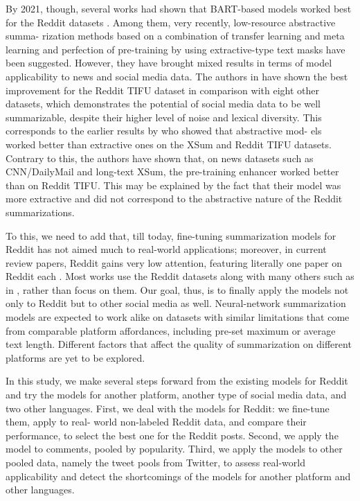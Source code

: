 By 2021, though, several works had shown that BART-based models worked best for the Reddit datasets \cite{ChenLiuZhong}. Among them, very recently, low-resource abstractive summa- rization methods based on a combination of transfer learning and meta learning \cite{ChenShuai} and perfection of pre-training by using extractive-type text masks \cite{ZhangZhaoSaleh} have been suggested. However, they have brought mixed results in terms of model applicability to news and social media data. The authors in \cite{ChenShuai} have shown the best improvement for the Reddit TIFU dataset in comparison with eight other datasets, which demonstrates the potential of social media data to be well summarizable, despite their higher level of noise and lexical diversity. This corresponds to the earlier results by \cite{ChenLiuZhong} who showed that abstractive mod- els worked better than extractive ones on the XSum and Reddit TIFU datasets. Contrary to this, the authors \cite{ZhangZhaoSaleh} have shown that, on news datasets such as CNN/DailyMail and long-text XSum, the pre-training enhancer worked better than on Reddit TIFU. This may be explained by the fact that their model was more extractive and did not correspond to the abstractive nature of the Reddit summarizations.

To this, we need to add that, till today, fine-tuning summarization models for Reddit has not aimed much to real-world applications; moreover, in current review papers, Reddit gains very low attention, featuring literally one paper on Reddit each \cite{AlomariIdrisSabri,ShiKeneshlooRamakrishnan}. Most works use the Reddit datasets along with many others such as in \cite{ChenLiuZhong}, rather than focus on them. Our goal, thus, is to finally apply the models not only to Reddit but to other social media as well. Neural-network summarization models are expected to work alike on datasets with similar limitations that come from comparable platform affordances, including pre-set maximum or average text length. Different factors that affect the quality of summarization on different platforms are yet to be explored.

In this study, we make several steps forward from the existing models for Reddit and try the models for another platform, another type of social media data, and two other languages. First, we deal with the models for Reddit: we fine-tune them, apply to real- world non-labeled Reddit data, and compare their performance, to select the best one for the Reddit posts. Second, we apply the model to comments, pooled by popularity. Third, we apply the models to other pooled data, namely the tweet pools from Twitter, to assess real-world applicability and detect the shortcomings of the models for another platform and other languages.

